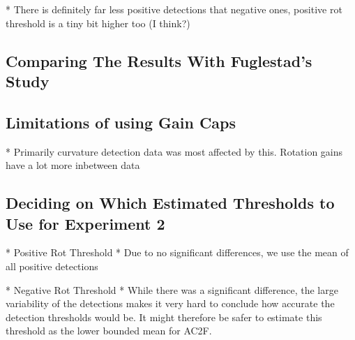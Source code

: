 * There is definitely far less positive detections that negative ones, positive rot threshold is a tiny bit higher too (I think?)

\subsection{Comparing The Results With Fuglestad's Study}

\subsection{Limitations of using Gain Caps}
* Primarily curvature detection data was most affected by this. Rotation gains have a lot more inbetween data

\subsection{Deciding on Which Estimated Thresholds to Use for Experiment 2}
* Positive Rot Threshold
   * Due to no significant differences, we use the mean of all positive detections
   
* Negative Rot Threshold
   * While there was a significant difference, the large variability of the detections makes it very hard to conclude how accurate the detection thresholds would be. It might therefore be safer to estimate this threshold as the lower bounded mean for AC2F.